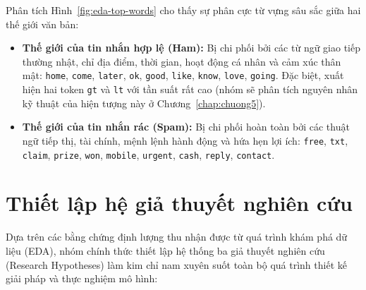 Phân tích Hình~\ref{fig:eda-top-words} cho thấy sự phân cực từ vựng sâu sắc giữa hai thế giới văn bản:
\begin{itemize}
    \item \textbf{Thế giới của tin nhắn hợp lệ (Ham):} Bị chi phối bởi các từ ngữ giao tiếp thường nhật, chỉ địa điểm, thời gian, hoạt động cá nhân và cảm xúc thân mật: \texttt{home}, \texttt{come}, \texttt{later}, \texttt{ok}, \texttt{good}, \texttt{like}, \texttt{know}, \texttt{love}, \texttt{going}. Đặc biệt, xuất hiện hai token \texttt{gt} và \texttt{lt} với tần suất rất cao (nhóm sẽ phân tích nguyên nhân kỹ thuật của hiện tượng này ở Chương~\ref{chap:chuong5}).
    \item \textbf{Thế giới của tin nhắn rác (Spam):} Bị chi phối hoàn toàn bởi các thuật ngữ tiếp thị, tài chính, mệnh lệnh hành động và hứa hẹn lợi ích: \texttt{free}, \texttt{txt}, \texttt{claim}, \texttt{prize}, \texttt{won}, \texttt{mobile}, \texttt{urgent}, \texttt{cash}, \texttt{reply}, \texttt{contact}.
\end{itemize}

\section{Thiết lập hệ giả thuyết nghiên cứu}
\label{sec:gia-thuyet}

Dựa trên các bằng chứng định lượng thu nhận được từ quá trình khám phá dữ liệu (EDA), nhóm chính thức thiết lập hệ thống ba giả thuyết nghiên cứu (Research Hypotheses) làm kim chỉ nam xuyên suốt toàn bộ quá trình thiết kế giải pháp và thực nghiệm mô hình:


